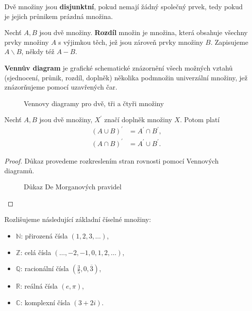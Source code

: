 \begin{definition}
  Dvě množiny jsou \textbf{disjunktní}, pokud nemají žádný společný prvek, tedy pokud je jejich průnikem prázdná množina.
\end{definition}

\begin{definition}
  Nechť $A, B$ jsou dvě množiny. \textbf{Rozdíl} množin je množina, která obsahuje všechny prvky množiny $A$ s výjimkou těch, jež jsou zároveň prvky množiny $B$. Zapisujeme $A \smallsetminus B$, někdy též $A-B$.
\end{definition}

\begin{definition}
  \textbf{Vennův diagram} je grafické schematické znázornění všech možných vztahů (sjednocení, průnik, rozdíl, doplněk) několika podmnožin univerzální množiny, jež znázorňujeme pomocí uzavřených čar.
\end{definition}

\begin{figure}[ht!]
  \centering
  \caption{Vennovy diagramy pro dvě, tři a čtyři množiny}
\end{figure}

\begin{veta}
  Nechť $A, B$ jsou dvě množiny, $X^\prime$ značí doplněk množiny $X$. Potom platí
  \begin{align*}
  (A \cup B)^\prime &= A^\prime \cap B^\prime, \\
  (A \cap B)^\prime &= A^\prime \cup B^\prime.
  \end{align*}
\end{veta}

\begin{proof} Důkaz provedeme rozkreslením stran rovnosti pomocí Vennových diagramů.
  \begin{figure}[ht!]
    \centering
    \caption{Důkaz De Morganových pravidel}
  \end{figure}
  \qedhere
\end{proof}

\begin{pozn}
  Rozlišujeme následující základní číselné množiny:
  \begin{itemize}
    \item $\mathbb{N}$: přirozená čísla $(1, 2, 3, \dots)$,
    \item $\mathbb{Z}$: celá čísla $(\dots, -2, -1, 0, 1, 2, \dots)$,
    \item $\mathbb{Q}$: racionální čísla $(\frac{3}{5}, 0{,}\overline{3})$,
    \item $\mathbb{R}$: reálná čísla $(e, \pi)$,
    \item $\mathbb{C}$: komplexní čísla $(3+2i)$.
  \end{itemize}
\end{pozn}

